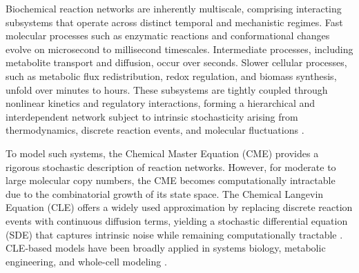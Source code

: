 \documentclass{article}
\begin{document}
Biochemical reaction networks are inherently multiscale, comprising interacting subsystems that operate across distinct temporal and mechanistic regimes. Fast molecular processes such as enzymatic reactions and conformational changes evolve on microsecond to millisecond timescales. Intermediate processes, including metabolite transport and diffusion, occur over seconds. Slower cellular processes, such as metabolic flux redistribution, redox regulation, and biomass synthesis, unfold over minutes to hours. These subsystems are tightly coupled through nonlinear kinetics and regulatory interactions, forming a hierarchical and interdependent network subject to intrinsic stochasticity arising from thermodynamics, discrete reaction events, and molecular fluctuations \cite{rao2003stochastic,goutsias2013markovian}.

To model such systems, the Chemical Master Equation (CME) provides a rigorous stochastic description of reaction networks. However, for moderate to large molecular copy numbers, the CME becomes computationally intractable due to the combinatorial growth of its state space. The Chemical Langevin Equation (CLE) offers a widely used approximation by replacing discrete reaction events with continuous diffusion terms, yielding a stochastic differential equation (SDE) that captures intrinsic noise while remaining computationally tractable \cite{gillespie2000chemical,gillespie2007stochastic,kurtz1972relationship,wilkinson2018stochastic,higham2008modeling}. CLE-based models have been broadly applied in systems biology, metabolic engineering, and whole-cell modeling \cite{karr2012whole,browning2020identifiability}.

\end{document}
